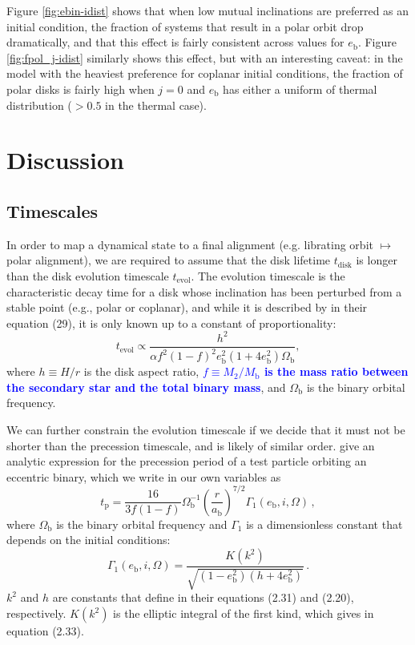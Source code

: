 \documentclass[twocolumn,linenumbers]{aastex631}
\newcommand{\RR}[1]{\textcolor{blue}{\bf#1}} %
\begin{document}
Figure \ref{fig:ebin-idist} shows that when low mutual inclinations are preferred as an initial condition, the fraction of systems that result in a polar orbit drop dramatically, and that this effect is fairly consistent across values for $e_\text{b}$. Figure \ref{fig:fpol_j-idist} similarly shows this effect, but with an interesting caveat: in the model with the heaviest preference for coplanar initial conditions, the fraction of polar disks is fairly high when $j=0$ and $e_\text{b}$ has either a uniform of thermal distribution ($>0.5$ in the thermal case).

\section{Discussion}
\label{sec:discussion}

\subsection{Timescales}
In order to map a dynamical state to a final alignment (e.g. librating orbit $\mapsto$ polar alignment), we are required to assume that the disk lifetime $t_\text{disk}$ is longer than the disk evolution timescale $t_\text{evol}$. The evolution timescale is the characteristic decay time for a disk whose inclination has been perturbed from a stable point (e.g., polar or coplanar), and while it is described by \citet{lubow2018} in their equation (29), it is only known up to a constant of proportionality:
\begin{equation}
    \label{eq:tevol}
    t_\text{evol} \propto \frac{h^2}{\alpha f^2(1-f)^2 e_\text{b}^2(1+4e_\text{b}^2) \Omega_\text{b}} ,
\end{equation}
where $h\equiv H/r$ is the disk aspect ratio, \RR{$f\equiv M_2/M_\text{b}$ is the mass ratio between the secondary star and the total binary mass}, and $\Omega_\text{b}$ is the binary orbital frequency. 

We can further constrain the evolution timescale if we decide that it must not be shorter than the precession timescale, and is likely of similar order. \citet[see eq. (2.32)]{farago2010} give an analytic expression for the precession period of a test particle orbiting an eccentric binary, which we write in our own variables as
\begin{equation}
    t_\text{p} = \frac{16}{3f(1-f)} \Omega_\text{b}^{-1} \left(\frac{r}{a_\text{b}}\right)^{7/2} \Gamma_1(e_\text{b},i,\Omega)\, ,
\end{equation}
where $\Omega_\text{b}$ is the binary orbital frequency and $\Gamma_1$ is a dimensionless constant that depends on the initial conditions:
\begin{equation}
    \Gamma_1(e_\text{b},i,\Omega) = \frac{K(k^2)}{\sqrt{(1-e_\text{b}^2)(h+4e_\text{b}^2)}} \, .
\end{equation}
$k^2$ and $h$ are constants that \citet{farago2010} define in their equations (2.31) and (2.20), respectively. $K(k^2)$ is the elliptic integral of the first kind, which \citet{farago2010} gives in equation (2.33).
\end{document}
